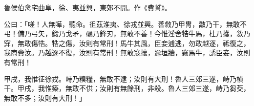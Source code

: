 
\begin{pinyinscope}
魯侯伯禽宅曲阜，徐、夷並興，東郊不開。作《費誓》。

公曰：「嗟！人無嘩，聽命。徂茲淮夷、徐戎並興。善敹乃甲冑，敿乃干，無敢不弔！備乃弓矢，鍛乃戈矛，礪乃鋒刃，無敢不善！今惟淫舍牿牛馬，杜乃擭，敜乃穽，無敢傷牿。牿之傷，汝則有常刑！馬牛其風，臣妾逋逃，勿敢越逐，祗復之，我商賚汝。乃越逐不復，汝則有常刑！無敢寇攘，逾垣牆，竊馬牛，誘臣妾，汝則有常刑！

甲戌，我惟征徐戎。峙乃糗糧，無敢不逮；汝則有大刑！魯人三郊三遂，峙乃楨干。甲戌，我惟築，無敢不供；汝則有無餘刑，非殺。魯人三郊三遂，峙乃芻茭，無敢不多；汝則有大刑！」


\end{pinyinscope}